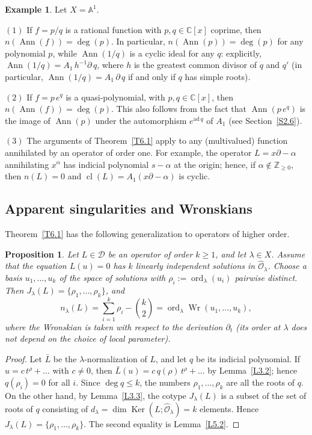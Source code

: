 \documentclass[11pt,reqno]{amsart}
\theoremstyle{plain}
\newtheorem{proposition}{Proposition}[section]
\theoremstyle{definition}
\newtheorem{example}{Example}[section]
\theoremstyle{remark}
\numberwithin{equation}{section}
\newcommand{\cD}{\mathcal{D}}
\newcommand{\cO}{\mathcal{O}}
\newcommand{\C}{\mathbb{C}}
\newcommand{\Z}{\mathbb{Z}}
\newcommand{\A}{\mathbb{A}}
\newcommand{\del}{\partial}
\newcommand{\hO}{\widehat{\cO}}
\DeclareMathOperator{\Ann}{Ann}
\DeclareMathOperator{\cl}{cl}
\DeclareMathOperator{\Ker}{Ker}
\DeclareMathOperator{\ord}{ord}
\DeclareMathOperator{\Wr}{Wr}
\begin{document}
\begin{example}
\label{Ex6.7}
Let $X = \A^1$.

$(1)$ If $f = p/q$ is a rational function with $p, q \in \C[x]$ coprime, then $n(\Ann(f)) =
\deg(p)$. In particular, $n(\Ann(p)) = \deg(p)$ for any polynomial $p$, while $\Ann(1/q)$ is a
cyclic ideal for any $q$: explicitly, $\Ann(1/q) = A_1\, h^{-1} \del\, q$, where $h$ is the
greatest common divisor of $q$ and $q'$ (in particular, $\Ann(1/q) = A_1\, \del\, q$ if and only
if $q$ has simple roots).

$(2)$ If $f = p\, e^{q}$ is a quasi-polynomial, with $p, q \in \C[x]$, then $n(\Ann(f)) =
\deg(p)$. This also follows from the fact that $\Ann(p\, e^{q})$ is the image of $\Ann(p)$ under
the automorphism $e^{\mathrm{ad}\, q}$ of $A_1$ (see Section~\ref{S2.6}).

$(3)$ The arguments of Theorem~\ref{T6.1} apply to any (multivalued) function annihilated by an
operator of order one. For example, the operator $L = x \del - \alpha$ annihilating $x^\alpha$ has
indicial polynomial $s - \alpha$ at the origin; hence, if $\alpha \notin \Z_{\ge 0}$, then
$n(L) = 0$ and $\cl(L) = A_1 (x \del - \alpha)$ is cyclic.
\end{example}

\subsection{Apparent singularities and Wronskians}
\label{S6.3}
Theorem~\ref{T6.1} has the following generalization to operators of higher order.

\begin{proposition}
\label{P6.1}
Let $L \in \cD$ be an operator of order $k \ge 1$, and let $\lambda \in X$. Assume that the
equation $L(u) = 0$ has $k$ linearly independent solutions in $\hO_\lambda$. Choose a basis
$u_1, \ldots, u_k$ of the space of solutions with $\rho_i := \ord_\lambda(u_i)$ pairwise
distinct. Then $J_\lambda(L) = \{\rho_1, \ldots, \rho_k\}$, and
\[
  n_\lambda(L) = \sum_{i=1}^k \rho_i - \binom{k}{2} = \ord_\lambda \Wr(u_1, \ldots, u_k) ,
\]
where the Wronskian is taken with respect to the derivation $\del_t$ (its order at $\lambda$ does
not depend on the choice of local parameter).
\end{proposition}

\begin{proof}
Let $\bar L$ be the $\lambda$-normalization of $L$, and let $q$ be its indicial polynomial. If
$u = c\, t^\rho + \ldots$ with $c \ne 0$, then $\bar L(u) = c\, q(\rho)\, t^\rho + \ldots$ by
Lemma~\ref{L3.2}; hence $q(\rho_i) = 0$ for all $i$. Since $\deg q \le k$, the numbers $\rho_1,
\ldots, \rho_k$ are all the roots of $q$. On the other hand, by Lemma~\ref{L3.3}, the cotype
$J_\lambda(L)$ is a subset of the set of roots of $q$ consisting of $d_\lambda = \dim \Ker(L;
\hO_\lambda) = k$ elements. Hence $J_\lambda(L) = \{\rho_1, \ldots, \rho_k\}$. The second equality
is Lemma~\ref{L5.2}.
\end{proof}
\end{document}
